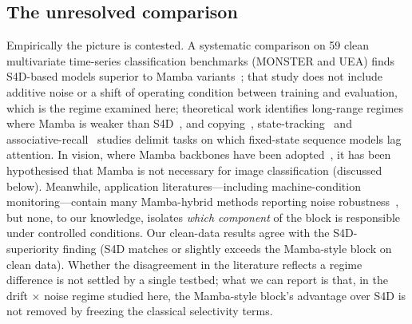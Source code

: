 \subsection{The unresolved comparison}
\label{sec:background:unresolved}

Empirically the picture is contested. A systematic comparison on 59 clean multivariate time-series classification benchmarks (MONSTER and UEA) finds S4D-based models superior to Mamba variants~\cite{saadatmand2026s4d}; that study does not include additive noise or a shift of operating condition between training and evaluation, which is the regime examined here; theoretical work identifies long-range regimes where Mamba is weaker than S4D~\cite{yu2025blockbiased}, and copying~\cite{jelassi2024copying}, state-tracking~\cite{merrill2024illusion} and associative-recall~\cite{arora2024zoology} studies delimit tasks on which fixed-state sequence models lag attention. In vision, where Mamba backbones have been adopted~\cite{zhu2024vim}, it has been hypothesised that Mamba is not necessary for image classification (discussed below). Meanwhile, application literatures---including machine-condition monitoring---contain many Mamba-hybrid methods reporting noise robustness~\cite{yi2025vibrmamba,nguyen2025mlfork,wang2025mdbimamba,xu2025indicative,lai2025denoising}, but none, to our knowledge, isolates \emph{which component} of the block is responsible under controlled conditions. Our clean-data results agree with the S4D-superiority finding (S4D matches or slightly exceeds the Mamba-style block on clean data). Whether the disagreement in the literature reflects a regime difference is not settled by a single testbed; what we can report is that, in the drift $\times$ noise regime studied here, the Mamba-style block's advantage over S4D is not removed by freezing the classical selectivity terms.

